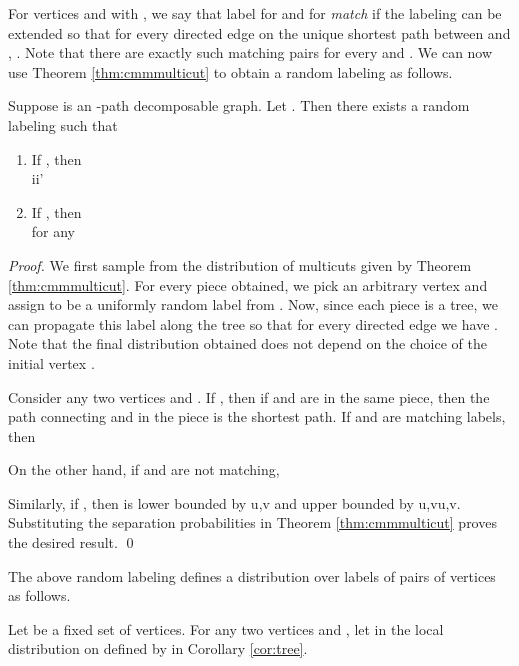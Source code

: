\documentclass[oribibl]{llncs}
\begin{document}
For vertices  and  with , we say that label 
for  and  for  \emph{match} if the labeling  can be extended so that for every directed edge  on the
unique shortest path between  and , . Note
that there are exactly  such matching pairs for every  and .
We can now use Theorem \ref{thm:cmmmulticut} to obtain a random
labeling as follows.
\begin{corollary} \label{cor:tree} Suppose  is an
	-path decomposable graph. Let . Then there exists a random labeling  such that 
	\begin{enumerate} 
		\item If , then 
			\\ ii'
		\item If , then
			\\  for any 
			 
	\end{enumerate}
\end{corollary}
\begin{proof}
We first sample from the distribution of multicuts given by Theorem
\ref{thm:cmmmulticut}. For every piece obtained, we pick an arbitrary
vertex  and assign  to be a uniformly random label from
. Now, since each piece is a tree, we can propagate this label
along the tree so that for every directed edge  we have . Note that the final distribution obtained
does not depend on the choice of the initial vertex .

Consider any two vertices  and . If , then if  and  are in the same piece, then the path connecting  and  in the piece is the shortest path. If  and  are matching labels, then

On the other hand, if  and  are not matching,

Similarly, if , then  is lower
bounded by u,v and upper
bounded by u,vu,v.  Substituting the
separation probabilities in Theorem \ref{thm:cmmmulticut} proves the
desired result. \qed \end{proof}

The above random labeling defines a distribution  over labels of pairs of vertices as follows.
\begin{definition} Let  be a fixed set
	of vertices. For any two vertices  and , let  in the local distribution on  defined by  in Corollary \ref{cor:tree}.
\end{definition}
\end{document}
